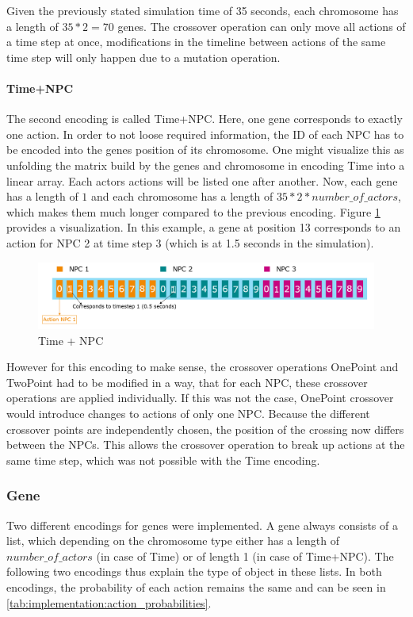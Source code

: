 Given the previously stated simulation time of 35 seconds, each chromosome has a length of $35 * 2 = 70$ genes.
The crossover operation can only move all actions of a time step at once, modifications in the timeline between actions of the same time step will only happen due to a mutation operation.

\paragraph{Time+NPC}
The second encoding is called Time+NPC. Here, one gene corresponds to exactly one action. In order to not loose required information, the ID of each NPC has to be encoded into the genes position of its chromosome. One might visualize this as unfolding the matrix build by the genes and chromosome in encoding Time into a linear array. Each actors actions will be listed one after another. Now, each gene has a length of $1$ and each chromosome has a length of $35 * 2 * number\_of\_actors$, which makes them much longer compared to the previous encoding. Figure \ref{fig:implementation:encoding_chromosome_time_npc} provides a visualization. In this example, a gene at position 13 corresponds to an action for NPC 2 at time step 3 (which is at 1.5 seconds in the simulation).

\begin{figure}[ht] 
	\includegraphics[width=1\linewidth]{figures/time_npc_encoding}
	\caption{Time + NPC}
	\label{fig:implementation:encoding_chromosome_time_npc}
\end{figure}

However for this encoding to make sense, the crossover operations OnePoint and TwoPoint had to be modified in a way, that for each NPC, these crossover operations are applied individually. If this was not the case, OnePoint crossover would introduce changes to actions of only one NPC. Because the different crossover points are independently chosen, the position of the crossing now differs between the NPCs. This allows the crossover operation to break up actions at the same time step, which was not possible with the Time encoding.

\subsubsection{Gene}
Two different encodings for genes were implemented. A gene always consists of a list, which depending on the chromosome type either has a length of $number\_of\_actors$ (in case of Time) or of length 1 (in case of Time+NPC). The following two encodings thus explain the type of object in these lists. In both encodings, the probability of each action remains the same and can be seen in \ref{tab:implementation:action_probabilities}.

